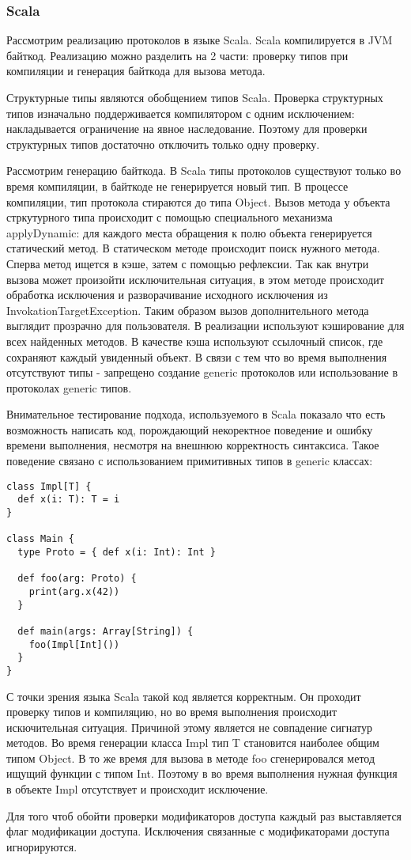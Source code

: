\subsubsection{Scala}
Рассмотрим реализацию протоколов в языке Scala\cite{scala:structural}. Scala компилируется в JVM байткод. Реализацию можно разделить на 2 части: проверку типов при компиляции и генерация байткода для вызова метода.

Структурные типы являются обобщением типов Scala. Проверка структурных типов изначально поддерживается компилятором с одним исключением: накладывается ограничение на явное наследование. Поэтому для проверки структурных типов достаточно отключить только одну проверку.

Рассмотрим генерацию байткода. В Scala типы протоколов существуют только во время компиляции, в байткоде не генерируется новый тип. В процессе компиляции, тип протокола стираются до типа Object. Вызов метода у объекта стркутурного типа происходит с помощью специального механизма applyDynamic: для каждого места обращения к полю объекта генерируется статический метод. В статическом методе происходит поиск нужного метода. Сперва метод ищется в кэше, затем с помощью рефлексии. Так как внутри вызова может произойти исключительная ситуация, в этом методе происходит обработка исключения и разворачивание исходного исключения из InvokationTargetException. Таким образом вызов дополнительного метода выглядит прозрачно для пользователя. В реализации используют кэширование для всех найденных методов. В качестве кэша используют ссылочный список, где сохраняют каждый увиденный объект. В связи с тем что во время выполнения отсутствуют типы - запрещено создание generic протоколов или использование в протоколах generic типов.

Внимательное тестирование подхода, используемого в Scala показало что есть возможность написать код, порождающий некоректное поведение и ошибку времени выполнения, несмотря на внешнюю корректность синтаксиса. Такое поведение связано с использованием примитивных типов в generic классах:

\begin{verbatim}
class Impl[T] {
  def x(i: T): T = i
}

class Main {
  type Proto = { def x(i: Int): Int }

  def foo(arg: Proto) {
    print(arg.x(42))
  }

  def main(args: Array[String]) {
    foo(Impl[Int]())
  }
}
\end{verbatim}

С точки зрения языка Scala такой код является корректным. Он проходит проверку типов и компиляцию, но во время выполнения происходит искючительная ситуация. Причиной этому является не совпадение сигнатур методов. Во время генерации класса Impl тип T становится наиболее общим типом Object. В то же время для вызова в методе foo сгенерировался метод ищущий функции с типом Int. Поэтому в во время выполнения нужная функция в объекте Impl отсутствует и происходит исключение.

Для того чтоб обойти проверки модификаторов доступа каждый раз выставляется флаг модификации доступа. Исключения связанные с модификаторами доступа игнорируются.